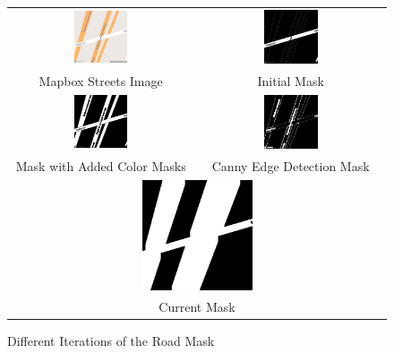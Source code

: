 \begin{figure}[htbp]
  \centering{}
  \begin{tabular}{cc}
    \includegraphics[width=0.30\textwidth]{images/streets.png}  & 
    \includegraphics[width=0.30\textwidth]{images/old_mask.png}                             \\
    Mapbox Streets Image                                        & Initial Mask              \\
    \includegraphics[width=0.30\textwidth]{images/new_mask.png} & 
    \includegraphics[width=0.30\textwidth]{images/canny_edge_mask.png}                      \\
    Mask with Added Color Masks                                 & Canny Edge Detection Mask \\
    \multicolumn{2}{c}{\includegraphics[width=0.30\textwidth]{images/current_mask.png}}     \\
    \multicolumn{2}{c}{Current Mask}
  \end{tabular}
  \caption{Different Iterations of the Road Mask}
  \label{fig:mask_iterations}
\end{figure}


